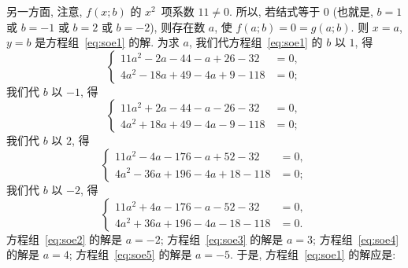 \documentclass[../libro.tex]{subfiles}
\begin{document}
\begin{example}
    另一方面,
    注意, \(f(x; b)\) 的 \(x^2\)~项系数 \(11 \neq 0\).
    所以, 若结式等于 \(0\)
    (也就是, \(b = 1\) 或 \(b = -1\)
    或 \(b = 2\) 或 \(b = -2\)),
    则存在数 \(a\), 使 \(f(a; b) = 0 = g(a; b)\).
    则 \(x = a\), \(y = b\)
    是方程组~\eqref{eq:soe1} 的解.
    为求 \(a\), 我们代方程组~\eqref{eq:soe1} 的
    \(b\) 以 \(1\), 得
    \begin{equation}
        \left\{ %
        \begin{aligned}
            11a^2 - 2a - 44 - a + 26 - 32  & = 0, \\
            4a^2 - 18a + 49 - 4a + 9 - 118 & = 0;
        \end{aligned}
        \right. %
        \label{eq:soe2}
    \end{equation}
    我们代 \(b\) 以 \(-1\), 得
    \begin{equation}
        \left\{ %
        \begin{aligned}
            11a^2 + 2a - 44 - a - 26 - 32  & = 0, \\
            4a^2 + 18a + 49 - 4a - 9 - 118 & = 0;
        \end{aligned}
        \right. %
        \label{eq:soe3}
    \end{equation}
    我们代 \(b\) 以 \(2\), 得
    \begin{equation}
        \left\{ %
        \begin{aligned}
            11a^2 - 4a - 176 - a + 52 - 32   & = 0, \\
            4a^2 - 36a + 196 - 4a + 18 - 118 & = 0;
        \end{aligned}
        \right. %
        \label{eq:soe4}
    \end{equation}
    我们代 \(b\) 以 \(-2\), 得
    \begin{equation}
        \left\{ %
        \begin{aligned}
            11a^2 + 4a - 176 - a - 52 - 32   & = 0, \\
            4a^2 + 36a + 196 - 4a - 18 - 118 & = 0.
        \end{aligned}
        \right. %
        \label{eq:soe5}
    \end{equation}
    方程组~\eqref{eq:soe2} 的解是 \(a = -2\);
    方程组~\eqref{eq:soe3} 的解是 \(a = 3\);
    方程组~\eqref{eq:soe4} 的解是 \(a = 4\);
    方程组~\eqref{eq:soe5} 的解是 \(a = -5\).
    于是, 方程组~\eqref{eq:soe1} 的解应是:
    \begin{equation*}

\end{equation*}
\end{example}
\end{document}
